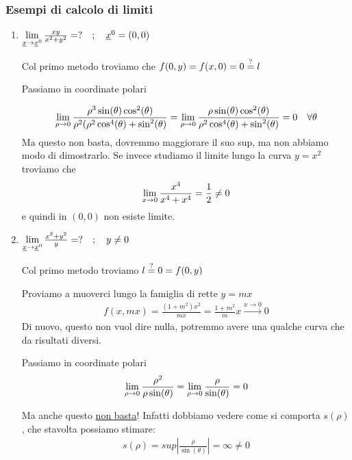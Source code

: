 \subsubsection{Esempi di calcolo di limiti}

\begin{enumerate}
	\item $\underset{\underline{x} \rightarrow \underline{x}^0}{\lim} \, \frac{xy}{x^2 +y^2}=? \quad ; \quad \underline{x}^0=(0,0)$
	
	Col primo metodo troviamo che $f(0,y)=f(x,0)=0\overset{?}{=} l$
	
	Passiamo in coordinate polari
	
	\begin{align}
	\underset{\rho \rightarrow 0}{\lim} \,\frac{\rho^3 \sin(\theta)\cos^2(\theta)}{\rho^2(\rho^2 \cos^4(\theta) + \sin^2(\theta)}= 	\underset{\rho \rightarrow 0}{\lim} \,\frac{\rho \sin(\theta)\cos^2(\theta)}{\rho^2 \cos^4(\theta) + \sin^2(\theta)}=0 \quad \forall \theta
	\end{align}
	Ma questo non basta, dovremmo maggiorare il suo sup, ma non abbiamo modo di dimostrarlo. Se invece studiamo il limite lungo la curva $y=x^2$ troviamo che
	\begin{align}
	\underset{x \rightarrow 0}{\lim} \, \frac{x^4}{x^4 + x^4}= \frac{1}{2}\neq 0
	\end{align}
	e quindi in $(0,0)$ non esiste limite.
	
	\item $\underset{\underline{x} \rightarrow \underline{x}^0}{\lim} \, \frac{x^2 + y^2}{y}=? \quad ; \quad y\neq 0$
	
	Col primo metodo troviamo $l\overset{?}{=} 0=f(0,y)$
	
	Proviamo a muoverci lungo la famiglia di rette $y=mx$
	\begin{align}
	f(x,mx)=\frac{(1+m^2)x^2}{mx}=\frac{1+m^2}{m}x\overset{x\rightarrow 0}{\longrightarrow}0 
	\end{align}
	Di nuovo, questo non vuol dire nulla, potremmo avere una qualche curva che da risultati diversi. 
	
	Passiamo in coordinate polari
	\begin{align}
	\underset{\rho \rightarrow 0}{\lim} \, \frac{\rho^2}{\rho \sin(\theta)} = 	\underset{\rho \rightarrow 0}{\lim} \, \frac{\rho}{\sin(\theta)}=0
	\end{align}
	

	Ma anche questo \underline{non basta}! Infatti dobbiamo vedere come si comporta $s(\rho)$, che stavolta possiamo stimare:
	\begin{align}
	s(\rho)= sup\left|\frac{\rho}{\sin(\theta)}\right|=\infty \neq 0
	\end{align}
	

\end{enumerate}
